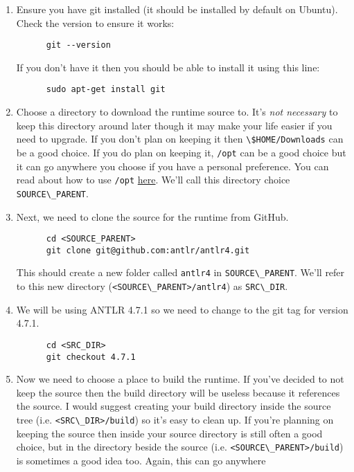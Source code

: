 \documentclass{article}
\begin{document}
\begin{enumerate}
  \item
    Ensure you have git installed (it should be installed by default on Ubuntu). Check the version
    to ensure it works:
    \begin{lstlisting}
      git --version
    \end{lstlisting}
    If you don't have it then you should be able to install it using this line:
    \begin{lstlisting}
      sudo apt-get install git
    \end{lstlisting}
  \item
    Choose a directory to download the runtime source to. It's \emph{not necessary} to keep this
    directory around later though it may make your life easier if you need to upgrade. If you don't
    plan on keeping it then \lstinline{\$HOME/Downloads} can be a good choice. If you do plan on
    keeping it, \lstinline{/opt} can be a good choice but it can go anywhere you choose if you have
    a personal preference. You can read about how to use \lstinline{/opt}
    \href{https://askubuntu.com/a/34922/550300} {here}. We'll call this directory choice
    \lstinline{SOURCE\_PARENT}.
  \item
    Next, we need to clone the source for the runtime from GitHub.
    \begin{lstlisting}
      cd <SOURCE_PARENT>
      git clone git@github.com:antlr/antlr4.git
    \end{lstlisting}
    This should create a new folder called \lstinline{antlr4} in \lstinline{SOURCE\_PARENT}. We'll
    refer to this new directory (\lstinline{<SOURCE\_PARENT>/antlr4}) as \lstinline{SRC\_DIR}.
  \item
    We will be using ANTLR 4.7.1 so we need to change to the git tag for version 4.7.1.
    \begin{lstlisting}
      cd <SRC_DIR>
      git checkout 4.7.1
    \end{lstlisting}
  \item
    Now we need to choose a place to build the runtime. If you've decided to not keep the source
    then the build directory will be useless because it references the source. I would suggest
    creating your build directory inside the source tree (i.e. \lstinline{<SRC\_DIR>/build}) so
    it's easy to clean up. If you're planning on keeping the source then inside your source
    directory is still often a good choice, but in the directory beside the source (i.e.
    \lstinline{<SOURCE\_PARENT>/build}) is sometimes a good idea too. Again, this can go anywhere

\end{enumerate}
\end{document}
